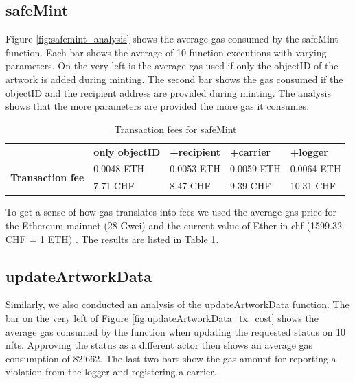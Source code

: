 \subsection*{safeMint}
Figure \ref{fig:safemint_analysis} shows the average gas consumed by the safeMint function. Each bar shows the average of 10 function executions with varying parameters. On the very left is the average gas used if only the objectID of the artwork is added during minting. The second bar shows the gas consumed if the objectID and the recipient address are provided during minting. The analysis shows that the more parameters are provided the more gas it consumes.

\begin{table}[]
\begin{tabular}{cllll}
                                          & \textbf{only objectID} & \textbf{+recipient} & \textbf{+carrier} & \textbf{+logger} \\ \cline{2-5} 
\multirow{2}{*}{\textbf{Transaction fee}} & 0.0048 ETH             & 0.0053 ETH          & 0.0059 ETH        & 0.0064 ETH       \\
                                          & 7.71 CHF               & 8.47 CHF            & 9.39 CHF          & 10.31 CHF       
\end{tabular}
\caption{Transaction fees for safeMint}
\label{tab:safemint_tx_fees}
\end{table}

To get a sense of how gas translates into fees we used the average gas price for the Ethereum mainnet (28 Gwei) \cite{gaspriceaverage} and the current value of Ether in \gls{chf} (1599.32 CHF = 1 ETH) \cite{coinmarketcap}. The results are listed in Table \ref{tab:safemint_tx_fees}.


\subsection*{updateArtworkData}
Similarly, we also conducted an analysis of the updateArtworkData function. The bar on the very left of Figure \ref{fig:updateArtworkData_tx_cost} shows the average gas consumed by the function when updating the requested status on 10 \glspl{nft}. Approving the status as a different actor then shows an average gas consumption of 82'662. The last two bars show the gas amount for reporting a violation from the logger and registering a carrier. 


